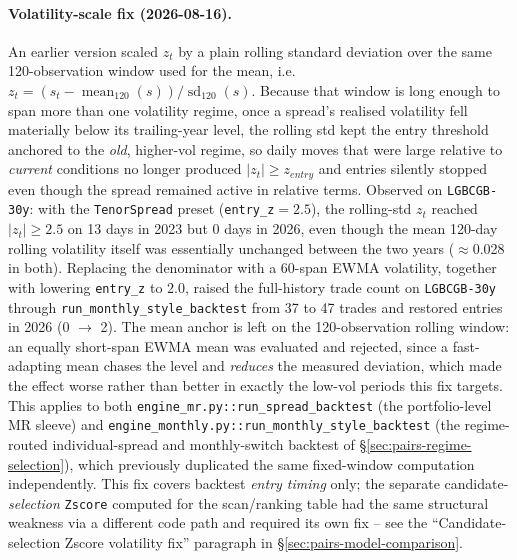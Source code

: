 \paragraph{Volatility-scale fix (2026-08-16).} An earlier version scaled $z_t$ by a
plain rolling standard deviation over the same 120-observation window used for the
mean, i.e.\ $z_t = (s_t - \operatorname{mean}_{120}(s))/\operatorname{sd}_{120}(s)$.
Because that window is long enough to span more than one volatility regime, once a
spread's realised volatility fell materially below its trailing-year level, the
rolling std kept the entry threshold anchored to the \emph{old}, higher-vol regime,
so daily moves that were large relative to \emph{current} conditions no longer
produced $|z_t| \ge z_{entry}$ and entries silently stopped even though the spread
remained active in relative terms. Observed on \texttt{LGBCGB-30y}: with the
\texttt{TenorSpread} preset (\texttt{entry\_z}$=2.5$), the rolling-std $z_t$ reached
$|z_t|\ge 2.5$ on 13 days in 2023 but 0 days in 2026, even though the mean 120-day
rolling volatility itself was essentially unchanged between the two years ($\approx$0.028
in both). Replacing the denominator with a 60-span EWMA
volatility, together with lowering \texttt{entry\_z} to $2.0$, raised the full-history
trade count on \texttt{LGBCGB-30y} through \texttt{run\_monthly\_style\_backtest} from
37 to 47 trades and restored entries in 2026 (0 $\to$ 2). The mean anchor is left on
the 120-observation rolling window: an equally short-span EWMA mean was evaluated and
rejected, since a fast-adapting mean chases the level and \emph{reduces} the measured
deviation, which made the effect worse rather than better in exactly the low-vol
periods this fix targets. This applies to both
\texttt{engine\_mr.py::run\_spread\_backtest} (the portfolio-level MR sleeve) and
\texttt{engine\_monthly.py::run\_monthly\_style\_backtest} (the regime-routed
individual-spread and monthly-switch backtest of \S\ref{sec:pairs-regime-selection}),
which previously duplicated the same fixed-window computation independently. This fix
covers backtest \emph{entry timing} only; the separate candidate-\emph{selection}
\texttt{Zscore} computed for the scan/ranking table had the same structural weakness
via a different code path and required its own fix -- see the
``Candidate-selection Zscore volatility fix'' paragraph in
\S\ref{sec:pairs-model-comparison}.

